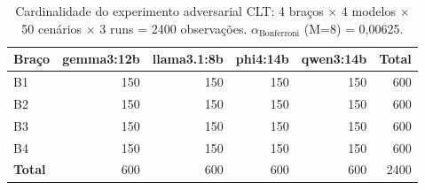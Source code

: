 \begin{table}[htbp]
\centering
\caption{Cardinalidade do experimento adversarial CLT: 4 braços × 4 modelos × 50 cenários × 3 runs = 2400 observações. $\alpha_\text{Bonferroni}$ (M=8) = 0{,}00625.}
\label{tab:t1_cardinalidade}
\small
\begin{tabular}{lrrrrr}
\toprule
Braço & gemma3:12b & llama3.1:8b & phi4:14b & qwen3:14b & Total \\
\midrule
B1 & 150 & 150 & 150 & 150 & 600 \\
B2 & 150 & 150 & 150 & 150 & 600 \\
B3 & 150 & 150 & 150 & 150 & 600 \\
B4 & 150 & 150 & 150 & 150 & 600 \\
\textbf{Total} & 600 & 600 & 600 & 600 & 2400 \\
\bottomrule
\end{tabular}
\end{table}
